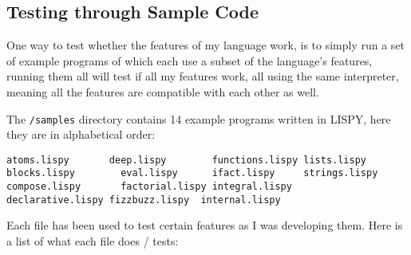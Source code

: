 \documentclass{article}
\newcommand{\code}[1]{\texttt{#1}}
\begin{document}
  \subsection{Testing through Sample Code}
    One way to test whether the features of my language work, is to simply
    run a set of example programs of which each use a subset of the language's
    features, running them all will test if all my features work, all using the
    same interpreter, meaning all the features are compatible with each other
    as well.

    The \code{/samples} directory contains 14 example programs written
    in LISPY, here they are in alphabetical order:
    \begin{Verbatim}
atoms.lispy	      deep.lispy	    functions.lispy lists.lispy
blocks.lispy	    eval.lispy	    ifact.lispy     strings.lispy
compose.lispy	    factorial.lispy integral.lispy
declarative.lispy fizzbuzz.lispy  internal.lispy
    \end{Verbatim}

    Each file has been used to test certain features as I was developing them.
    Here is a list of what each file does / tests:
\end{document}
